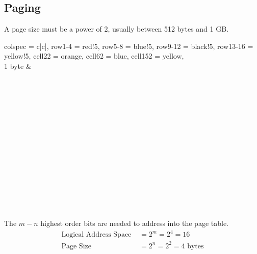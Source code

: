 \documentclass[a4paper]{article}
\begin{document}
\begin{multicols*}{2}
    \subsection*{Paging}
    A page size must be a power of 2, usually between 512 bytes and 1 GB.
    \begin{multicols*}{2}
        \begin{minipage}{0.5\columnwidth}
            \begin{tblr}{
                    colspec = {c|c|},
                    row{1-4} = {red!5},
                    row{5-8} = {blue!5},
                    row{9-12} = {black!5},
                    row{13-16} = {yellow!5},
                    cell{2}{2} = {orange},
                    cell{6}{2} = {blue},
                    cell{15}{2} = {yellow},
                }
                 \\
                1 byte &  \\
                 \\
                 \\
                 \\
                 \\
                 \\
                 \\
                 \\
                 \\
                 \\
                 \\
                 \\
                 \\
                 \\
                 \\
            \end{tblr}
        \end{minipage}
        \columnbreak
        \begin{minipage}{1.5\columnwidth}
            The \(m-n\) highest order bits are needed to address into the page
            table.
            \begin{align*}
                \text{Logical Address Space } & = 2^m = 2^4 = 16              \\
                \text{Page Size}              & = 2^n = 2^2 = 4 \text{ bytes} \\
            \end{align*}


\end{minipage}
\end{multicols*}
\end{multicols*}
\end{document}
